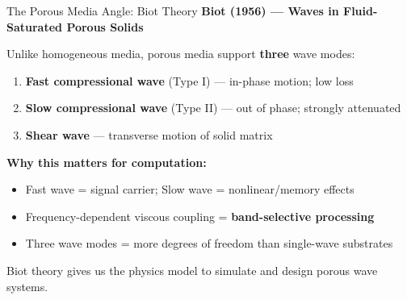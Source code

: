 \documentclass[aspectratio=169,11pt]{beamer}
\begin{document}
\begin{frame}{The Porous Media Angle: Biot Theory}
  \textbf{Biot (1956) --- Waves in Fluid-Saturated Porous Solids}
  \vspace{0.1cm}

  {\small Unlike homogeneous media, porous media support \textbf{three} wave modes:}
  \begin{enumerate}
    \item {\small \textbf{Fast compressional wave} (Type I) --- in-phase motion; low loss}
    \item {\small \textbf{Slow compressional wave} (Type II) --- out of phase; strongly attenuated}
    \item {\small \textbf{Shear wave} --- transverse motion of solid matrix}
  \end{enumerate}

  \vspace{0.1cm}
  {\small \textbf{Why this matters for computation:}}
  \begin{itemize}
    \item {\small Fast wave = signal carrier; Slow wave = nonlinear/memory effects}
    \item {\small Frequency-dependent viscous coupling = \textbf{band-selective processing}}
    \item {\small Three wave modes = more degrees of freedom than single-wave substrates}
  \end{itemize}

  \vspace{0.05cm}
  \textcolor{gdpDarkBlue}{\small Biot theory gives us the physics model to simulate and design porous wave systems.}
\end{frame}
\end{document}
